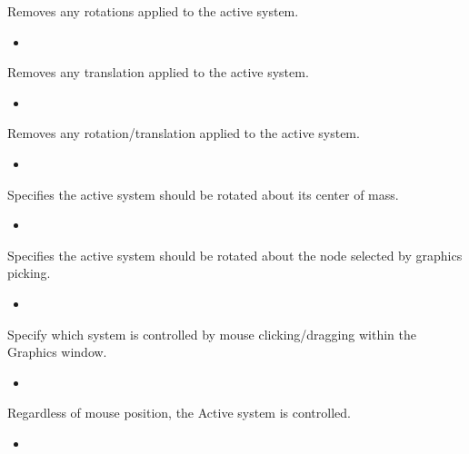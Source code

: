 \documentclass[letterpaper,11pt,english]{sphinxmanual}
\begin{document}
\sphinxAtStartPar
Removes any rotations applied to the active system.
\begin{itemize}
\item {} 
\sphinxAtStartPar
{}

\end{itemize}

\sphinxAtStartPar
Removes any translation applied to the active system.
\begin{itemize}
\item {} 
\sphinxAtStartPar
{}

\end{itemize}

\sphinxAtStartPar
Removes any rotation/translation applied to the active system.
\begin{itemize}
\item {} 
\sphinxAtStartPar
{}

\end{itemize}

\sphinxAtStartPar
Specifies the active system should be rotated about its center of mass.
\begin{itemize}
\item {} 
\sphinxAtStartPar
{}

\end{itemize}

\sphinxAtStartPar
Specifies the active system should be rotated about the node selected by graphics picking.
\begin{itemize}
\item {} 
\sphinxAtStartPar
{}

\end{itemize}

\sphinxAtStartPar
Specify which system is controlled by mouse clicking/dragging within the Graphics window.
\begin{itemize}
\item {} 
\sphinxAtStartPar
{}

\end{itemize}

\sphinxAtStartPar
Regardless of mouse position, the Active system is controlled.
\begin{itemize}
\item {} 
\sphinxAtStartPar
{}

\end{itemize}
\end{document}
